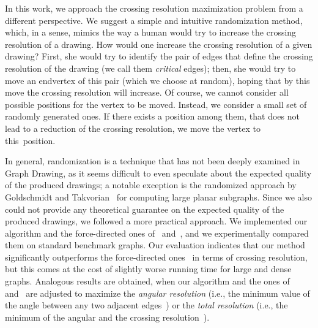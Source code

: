 \documentclass[runningheads]{llncs}
\begin{document}
In this work, we approach the crossing resolution maximization problem from a different perspective. We suggest a simple and intuitive randomization method,
which, in a sense, mimics the way a human would try to increase the crossing resolution of a drawing. How would one increase the crossing resolution of a given drawing? First, she would try to identify the pair of edges that define the crossing resolution of the drawing (we call them \emph{critical} edges); then, she would try to move an endvertex of this pair (which we choose at random), hoping that by this move the crossing resolution will increase. Of course, we cannot consider all possible positions for the vertex to be moved. Instead, we consider a small set of randomly generated ones. If there exists a position among them, that does not lead to a reduction of the crossing resolution, we move the vertex to this~position.

In general, randomization is a technique that has not been deeply examined in Graph Drawing, as it seems difficult to even speculate about the expected quality of the produced drawings; a notable exception is the randomized approach by Goldschmidt and Takvorian~\cite{DBLP:journals/networks/GoldschmidtT94} for computing large planar subgraphs. Since we also could not provide any theoretical guarantee on the expected quality of the produced drawings,
we followed a more practical approach. We implemented our algorithm and the force-directed ones of~\cite{DBLP:journals/cj/ArgyriouBS13} and~\cite{DBLP:journals/vlc/HuangEHL13}, and we experimentally compared them on standard benchmark graphs.
Our evaluation indicates that our method significantly outperforms the force-directed ones~\cite{DBLP:journals/cj/ArgyriouBS13,DBLP:journals/vlc/HuangEHL13} in terms of crossing resolution, but this comes at the cost of slightly worse running time
for large and dense graphs. Analogous results are obtained, when our algorithm and the ones of~\cite{DBLP:journals/cj/ArgyriouBS13} and~\cite{DBLP:journals/vlc/HuangEHL13} are adjusted to maximize  the \emph{angular resolution} (i.e., the minimum value of the angle between any two adjacent edges~\cite{DBLP:journals/siamcomp/FormannHHKLSWW93}) or the \emph{total resolution} (i.e., the minimum of the angular and the crossing resolution~\cite{DBLP:journals/cj/ArgyriouBS13}).
\end{document}
